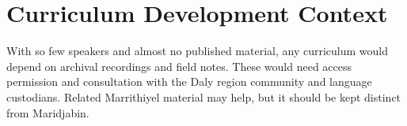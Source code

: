 \documentclass[12pt]{article}
\begin{document}
\section{Curriculum Development Context}
With so few speakers and almost no published material, any curriculum would depend on archival recordings and field notes. These would need access permission and consultation with the Daly region community and language custodians. Related Marrithiyel material may help, but it should be kept distinct from Maridjabin.
\end{document}
